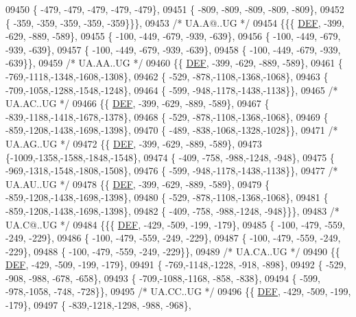 \begin{DoxyCode}
09450 \{ -479, -479, -479, -479, -479\},
09451 \{ -809, -809, -809, -809, -809\},
09452 \{ -359, -359, -359, -359, -359\}\}\},
09453 \textcolor{comment}{/* UA.A@..UG */}
09454 \{\{\{  \mbox{\hyperlink{1_88_84__epars_8h_a397419fc12b37ed479c8abb9d444d843}{DEF}}, -399, -629, -889, -589\},
09455 \{ -100, -449, -679, -939, -639\},
09456 \{ -100, -449, -679, -939, -639\},
09457 \{ -100, -449, -679, -939, -639\},
09458 \{ -100, -449, -679, -939, -639\}\},
09459 \textcolor{comment}{/* UA.AA..UG */}
09460 \{\{  \mbox{\hyperlink{1_88_84__epars_8h_a397419fc12b37ed479c8abb9d444d843}{DEF}}, -399, -629, -889, -589\},
09461 \{ -769,-1118,-1348,-1608,-1308\},
09462 \{ -529, -878,-1108,-1368,-1068\},
09463 \{ -709,-1058,-1288,-1548,-1248\},
09464 \{ -599, -948,-1178,-1438,-1138\}\},
09465 \textcolor{comment}{/* UA.AC..UG */}
09466 \{\{  \mbox{\hyperlink{1_88_84__epars_8h_a397419fc12b37ed479c8abb9d444d843}{DEF}}, -399, -629, -889, -589\},
09467 \{ -839,-1188,-1418,-1678,-1378\},
09468 \{ -529, -878,-1108,-1368,-1068\},
09469 \{ -859,-1208,-1438,-1698,-1398\},
09470 \{ -489, -838,-1068,-1328,-1028\}\},
09471 \textcolor{comment}{/* UA.AG..UG */}
09472 \{\{  \mbox{\hyperlink{1_88_84__epars_8h_a397419fc12b37ed479c8abb9d444d843}{DEF}}, -399, -629, -889, -589\},
09473 \{-1009,-1358,-1588,-1848,-1548\},
09474 \{ -409, -758, -988,-1248, -948\},
09475 \{ -969,-1318,-1548,-1808,-1508\},
09476 \{ -599, -948,-1178,-1438,-1138\}\},
09477 \textcolor{comment}{/* UA.AU..UG */}
09478 \{\{  \mbox{\hyperlink{1_88_84__epars_8h_a397419fc12b37ed479c8abb9d444d843}{DEF}}, -399, -629, -889, -589\},
09479 \{ -859,-1208,-1438,-1698,-1398\},
09480 \{ -529, -878,-1108,-1368,-1068\},
09481 \{ -859,-1208,-1438,-1698,-1398\},
09482 \{ -409, -758, -988,-1248, -948\}\}\},
09483 \textcolor{comment}{/* UA.C@..UG */}
09484 \{\{\{  \mbox{\hyperlink{1_88_84__epars_8h_a397419fc12b37ed479c8abb9d444d843}{DEF}}, -429, -509, -199, -179\},
09485 \{ -100, -479, -559, -249, -229\},
09486 \{ -100, -479, -559, -249, -229\},
09487 \{ -100, -479, -559, -249, -229\},
09488 \{ -100, -479, -559, -249, -229\}\},
09489 \textcolor{comment}{/* UA.CA..UG */}
09490 \{\{  \mbox{\hyperlink{1_88_84__epars_8h_a397419fc12b37ed479c8abb9d444d843}{DEF}}, -429, -509, -199, -179\},
09491 \{ -769,-1148,-1228, -918, -898\},
09492 \{ -529, -908, -988, -678, -658\},
09493 \{ -709,-1088,-1168, -858, -838\},
09494 \{ -599, -978,-1058, -748, -728\}\},
09495 \textcolor{comment}{/* UA.CC..UG */}
09496 \{\{  \mbox{\hyperlink{1_88_84__epars_8h_a397419fc12b37ed479c8abb9d444d843}{DEF}}, -429, -509, -199, -179\},
09497 \{ -839,-1218,-1298, -988, -968\},

\end{DoxyCode}
